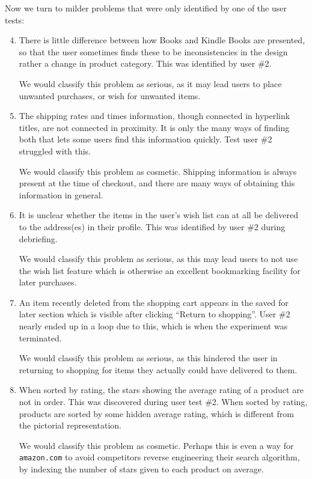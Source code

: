 Now we turn to milder problems that were only identified by one of the user
tests:

\begin{enumerate}

\setcounter{enumi}{3}

\item There is little difference between how Books and Kindle Books are
presented, so that the user sometimes finds these to be inconsistencies in the
design rather a change in product category. This was identified by user \#2.

We would classify this problem as serious, as it may lead users to place
unwanted purchases, or wish for unwanted items.

\item The shipping rates and times information, though connected in hyperlink
titles, are not connected in proximity. It is only the many ways of finding
both that lets some users find this information quickly. Test user \#2
struggled with this.

We would classify this problem as cosmetic. Shipping information is always
present at the time of checkout, and there are many ways of obtaining this
information in general.

\item It is unclear whether the items in the user's wish list can at all be
delivered to the address(es) in their profile. This was identified by user \#2
during debriefing.

We would classify this problem as serious, as this may lead users to not use
the wish list feature which is otherwise an excellent bookmarking facility for
later purchases.

\item An item recently deleted from the shopping cart appears in the saved for
later section which is visible after clicking ``Return to shopping''. User \#2
nearly ended up in a loop due to this, which is when the experiment was
terminated.

We would classify this problem as serious, as this hindered the user in
returning to shopping for items they actually could have delivered to them.

\item When sorted by rating, the stars showing the average rating of a product
are not in order. This was discovered during user test \#2. When sorted by
rating, products are sorted by some hidden average rating, which is different
from the pictorial representation.

We would classify this problem as cosmetic. Perhaps this is even a way for
\texttt{amazon.com} to avoid competitors reverse engineering their search
algorithm, by indexing the number of stars given to each product on average.

\end{enumerate}
